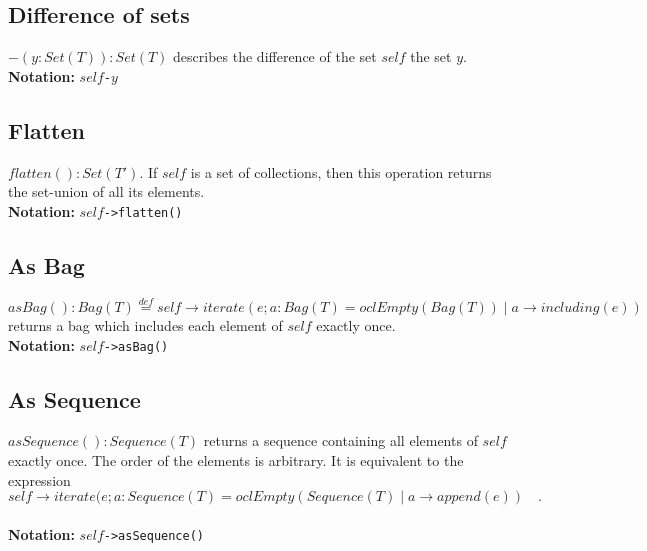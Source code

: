\subsection{Difference of sets}
$-(y:\mathit{Set}(T)):\mathit{Set}(T)$ describes the difference of the set
  $\mathit{self}$ the set $y$.\\
  {\bf Notation:} $\mathit{self}$\verb+-+$y$
\subsection{Flatten}
$\mathit{flatten}():\mathit{Set}(T')$.  If $\mathit{self}$ is a set of
collections,
  then this operation returns the set-union of all its elements.\\
  {\bf Notation:} $\mathit{self}$\verb+->flatten()+
\subsection{As Bag}
$\mathit{asBag}():
  \mathit{Bag}(T)\stackrel{def}{=}\mathit{self}\rightarrow\mathit{iterate}(e;a:\mathit{Bag}(T)=\mathit{oclEmpty}(\mathit{Bag}(T))\mid
  a\rightarrow\mathit{including}(e))$ returns a bag which includes each
  element of $\mathit{self}$ exactly once.\\
  {\bf Notation:} $\mathit{self}$\verb+->asBag()+
\subsection{As Sequence}
$\mathit{asSequence}(): \mathit{Sequence}(T)$ returns a sequence
containing
  all elements of $\mathit{self}$ exactly once.  The order of the elements is
  arbitrary.  It is equivalent to the expression
  \begin{equation*}
    {\mathit{self}\rightarrow\mathit{iterate}(e;a:\mathit{Sequence}(T)=\mathit{oclEmpty}(\mathit{Sequence}(T)\mid
      a\rightarrow\mathit{append}(e))}\quad.
  \end{equation*}\\
  {\bf Notation:} $\mathit{self}$\verb+->asSequence()+
